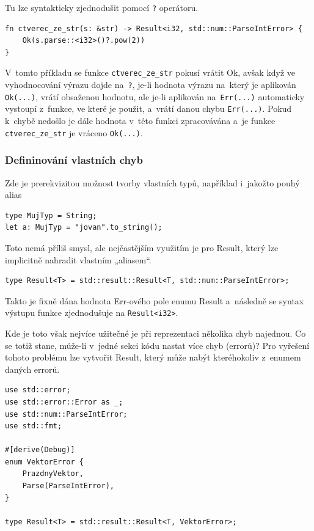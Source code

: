 \documentclass[a4paper, 12pt]{article} %
\newcommand{\rust}[1]{\texttt{#1}}
\begin{document}
        Tu lze syntakticky zjednodušit pomocí \rust{?} operátoru.
        \begin{verbatim}
fn ctverec_ze_str(s: &str) -> Result<i32, std::num::ParseIntError> {
    Ok(s.parse::<i32>()?.pow(2))
}
        \end{verbatim}

        V~tomto příkladu se funkce \rust{ctverec_ze_str} pokusí vrátit Ok, avšak když ve vyhodnocování výrazu dojde na~\rust{?}, je-li hodnota výrazu na~který je aplikován \rust{Ok(...)}, vrátí obsaženou hodnotu, ale je-li aplikován na~\rust{Err(...)} automaticky vystoupí z~funkce, ve které je použit, a~vrátí danou chybu \rust{Err(...)}. Pokud k~chybě nedošlo je dále hodnota v~této funkci zpracovávána a~je funkce \rust{ctverec_ze_str} je vráceno \rust{Ok(...)}.
        
        \subsubsection*{Defininování vlastních chyb}
            Zde je prerekvizitou možnost tvorby vlastních typů, například i~jakožto pouhý alias
            \begin{verbatim}
type MujTyp = String;
let a: MujTyp = "jovan".to_string();
            \end{verbatim}
        
            Toto nemá příliš smysl, ale nejčastějším využitím je pro Result, který lze implicitně nahradit vlastním „aliasem“.
            \begin{verbatim}
type Result<T> = std::result::Result<T, std::num::ParseIntError>;
            \end{verbatim}
            
            Takto je fixně dána hodnota Err-ového pole enumu Result a~následně se syntax výstupu funkce zjednodušuje na \rust{Result<i32>}.

            Kde je toto však nejvíce užitečné je při reprezentaci několika chyb najednou. Co se totiž stane, může-li v~jedné sekci kódu nastat více chyb (errorů)? Pro vyřešení tohoto problému lze vytvořit Result, který může nabýt kteréhokoliv z~enumem daných errorů.
            \begin{verbatim}
use std::error;
use std::error::Error as _;
use std::num::ParseIntError;
use std::fmt;

#[derive(Debug)]
enum VektorError {
    PrazdnyVektor,
    Parse(ParseIntError),
}

type Result<T> = std::result::Result<T, VektorError>;
            \end{verbatim}
            
\end{document}
